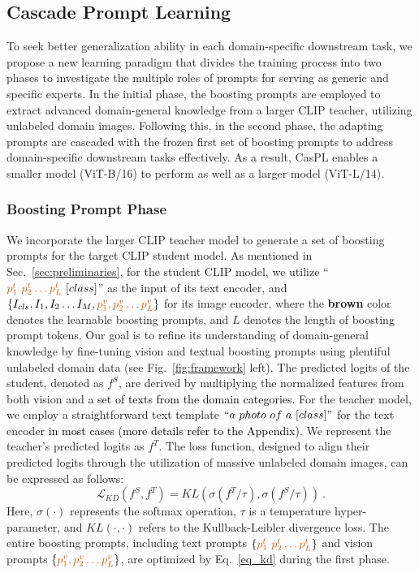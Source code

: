 \documentclass[runningheads]{llncs}
\newcommand{\implus}[1]{\textcolor{black}{#1}}
\begin{document}
{\subsection{Cascade Prompt Learning}
\label{sec:CasPL}
{To seek better generalization ability in each domain-specific downstream task, we propose a new learning paradigm that divides the training process into two phases to investigate the multiple roles of prompts for serving as generic and specific experts.
In the initial phase, the boosting prompts are employed to extract advanced domain-general knowledge from a larger CLIP teacher, utilizing unlabeled domain images. Following this, in the second phase, the adapting prompts are cascaded with the frozen first set of boosting prompts to address domain-specific downstream tasks effectively. As a result, CasPL enables a smaller model (ViT-B/16) to perform as well as a larger model (ViT-L/14).


\subsubsection{Boosting Prompt Phase}
We incorporate the larger CLIP teacher model to generate a set of boosting prompts for the target CLIP student model. As mentioned in Sec.~\ref{sec:preliminaries}, for the student CLIP model, we utilize ``${\color{boost_line}{p_1^t \ p_2^t\dots p_L^t}}\ [class]$'' as the input of its text encoder, and $\{I_{cls},I_1,I_2\dots I_M, {\color{boost_line}{p^v_1,p_2^v\dots p_L^v}} \}$ for its image encoder, where the \textbf{\textcolor{boost_line}{brown}} color denotes the learnable boosting prompts, and $L$ denotes the length of boosting prompt tokens. Our goal is to refine its understanding of domain-general knowledge by fine-tuning vision and textual boosting prompts using plentiful unlabeled domain data (see Fig.~\ref{fig:framework} left). The predicted logits of the student, denoted as $f^S$, are derived by multiplying the normalized features from both vision and \implus{a set of texts from the domain categories}. For the teacher model, we employ a straightforward text template ${``a\ photo\ of\ a\ [class]"}$ for the text encoder \implus{in most cases (more details refer to the Appendix)}. We represent the teacher's predicted logits as $f^T$. The loss function, designed to align their predicted logits through the utilization of massive unlabeled domain images, can be expressed as follows:
\begin{equation}
\label{eq_kd}
\mathcal{L}_{KD}(f^S, f^T)=KL(\sigma({f^T}/\tau), \sigma(f^S/\tau))\ .
\end{equation}
Here, $\sigma(\cdot)$ represents the softmax operation, $\tau$ is a temperature hyper-parameter, and $KL(\cdot,\cdot)$ refers to the Kullback-Leibler divergence loss. The entire boosting prompts, including text prompts $\{{\color{boost_line}{p_1^t \ p_2^t\dots p_L^t}}\}$ and vision prompts $\{{\color{boost_line}{p^v_1,p_2^v\dots p_L^v}}\}$, are optimized by Eq.~\eqref{eq_kd} during the first phase.


}}
\end{document}
